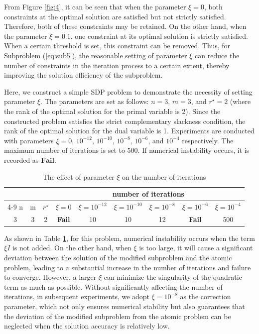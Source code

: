 \documentclass{jcmlatex}
\begin{document}
From Figure \ref{fig:4}, it can be seen that when the parameter \(\xi = 0\), both constraints at the optimal solution are satisfied but not strictly satisfied. Therefore, both of these constraints may be retained. On the other hand, when the parameter \(\xi = 0.1\), one constraint at its optimal solution is strictly satisfied. When a certain threshold is set, this constraint can be removed. Thus, for Subproblem (\ref{eq:sub5}), the reasonable setting of parameter \(\xi\) can reduce the number of constraints in the iteration process to a certain extent, thereby improving the solution efficiency of the subproblem.  

Here, we construct a simple SDP problem to demonstrate the necessity of setting parameter \(\xi\). The parameters are set as follows: \(n = 3\), \(m = 3\), and \(r^{\star} = 2\) (where the rank of the optimal solution for the primal variable is 2). Since the constructed problem satisfies the strict complementary slackness condition, the rank of the optimal solution for the dual variable is 1. Experiments are conducted with parameters \(\xi = 0\), \(10^{-12}\), \(10^{-10}\), \(10^{-8}\), \(10^{-6}\), and \(10^{-4}\) respectively. The maximum number of iterations is set to 500. If numerical instability occurs, it is recorded as \(\textbf{Fail}\).  
\begin{table}
    \centering    
    \caption{The effect of parameter \(\xi\) on the number of iterations}\label{t1}
    \setlength\tabcolsep{0.9pt}
    \begin{tabular*}{\textwidth}{@{\extracolsep\fill}ccccccccc}
\toprule 
~&~&~& \multicolumn{6}{c}{number of iterations}  \\ 
\cmidrule{4-9}
n&m&\(r^{\star}\)&\(\xi=0\)&\(\xi=10^{-12}\)&\(\xi=10^{-10}\)&\(\xi=10^{-8}\)&\(\xi=10^{-6}\)&\(\xi =10^{-4}\)\\
\midrule    
3&3&2&\textbf{Fail} &10 &10 &12 &\textbf{Fail} &500 \\
\hline
\end{tabular*}
\end{table}

As shown in Table \ref{t1}, for this problem, numerical instability occurs when the term \(\xi I\) is not added. On the other hand, when \(\xi\) is too large, it will cause a significant deviation between the solution of the modified subproblem and the atomic problem, leading to a substantial increase in the number of iterations and failure to converge. However, a larger \(\xi\) can minimize the singularity of the quadratic term as much as possible. Without significantly affecting the number of iterations, in subsequent experiments, we adopt \(\xi=10^{-8}\) as the correction parameter, which not only ensures numerical stability but also guarantees that the deviation of the modified subproblem from the atomic problem can be neglected when the solution accuracy is relatively low.
\end{document}
